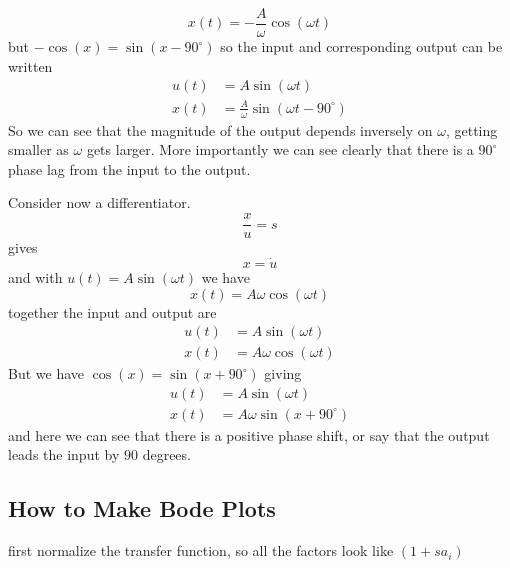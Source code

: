 \begin{equation*}
  x(t)=-\frac{A}{\omega}\cos(\omega t)
\end{equation*}
but $-\cos(x)=\sin(x-90^{\circ})$ so the input and corresponding output can be written
\begin{equation*}
  \begin{split}
    u(t)&=A\sin(\omega t) \\
    x(t)&=\frac{A}{\omega}\sin(\omega t-90^{\circ})
  \end{split}
\end{equation*}
So we can see that the magnitude of the output depends inversely on $\omega$, getting smaller as $\omega$ gets larger.
More importantly we can see clearly that there is a $90^{\circ}$ phase lag from the input to the output.

Consider now a differentiator.
\begin{equation*}
  \frac{x}{u}=s
\end{equation*}
gives
\begin{equation*}
  x=\dot{u}
\end{equation*}
and with $u(t)=A\sin(\omega t)$ we have
\begin{equation*}
  x(t)=A\omega\cos(\omega t)
\end{equation*}
together the input and output are
\begin{equation*}
  \begin{split}
    u(t)&=A\sin(\omega t) \\
    x(t)&=A\omega\cos(\omega t)
  \end{split}
\end{equation*}
But we have $\cos(x)=\sin(x+90^{\circ})$ giving
\begin{equation*}
  \begin{split}
    u(t)&=A\sin(\omega t) \\
    x(t)&=A\omega\sin(x+90^{\circ})
  \end{split}
\end{equation*}
and here we can see that there is a positive phase shift, or say that the output leads the input by $90$ degrees.

\subsection{How to Make Bode Plots}

first normalize the transfer function, so all the factors look like $(1+sa_{i})$
